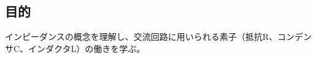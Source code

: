 \documentclass[uplatex,a4j,dvipdfmx]{jsarticle}
\begin{document}
\pagestyle{empty}

\hypersetup{pageanchor=false} %
\ExperimentReportCover
\hypersetup{pageanchor=true} %

\cleardoublepage %
\setcounter{page}{1}

\subsection{目的}
インピーダンスの概念を理解し、交流回路に用いられる素子（抵抗R、コンデンサC、インダクタL）の働きを学ぶ。
\end{document}
